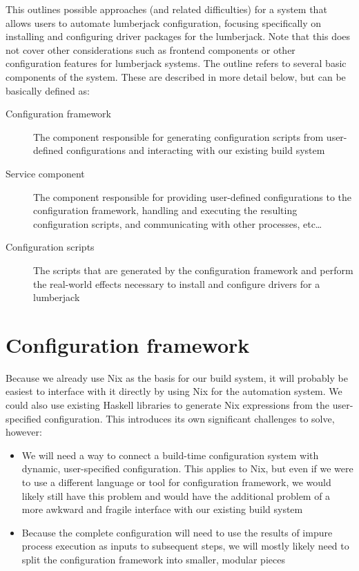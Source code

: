 \documentclass[11pt]{article}
\author{Rory Tyler Hayford}
\date{\today}
\title{}
\begin{document}
\setcounter{tocdepth}{3}
\tableofcontents

This outlines possible approaches (and related difficulties) for a system that allows users to automate lumberjack configuration, focusing specifically on installing and configuring driver packages for the lumberjack. Note that this does not cover other considerations such as frontend components or other configuration features for lumberjack systems. The outline refers to several basic components of the system. These are described in more detail below, but can be basically defined as:
\begin{description}
\item[{Configuration framework}] The component responsible for generating configuration scripts from user-defined configurations and interacting with our existing build system
\item[{Service component}] The component responsible for providing user-defined configurations to the configuration framework, handling and executing the resulting configuration scripts, and communicating with other processes, etc\ldots{}
\item[{Configuration scripts}] The scripts that are generated by the configuration framework and perform the real-world effects necessary to install and configure drivers for a lumberjack
\end{description}
\section*{Configuration framework}
\label{sec:org857922d}
Because we already use Nix as the basis for our build system, it will probably be easiest to interface with it directly by using Nix for the automation system. We could also use existing Haskell libraries to generate Nix expressions from the user-specified configuration. This introduces its own significant challenges to solve, however:
\begin{itemize}
\item We will need a way to connect a build-time configuration system with dynamic, user-specified configuration. This applies to Nix, but even if we were to use a different language or tool for configuration framework, we would likely still have this problem and would have the additional problem of a more awkward and fragile interface with our existing build system
\item Because the complete configuration will need to use the results of impure process execution as inputs to subsequent steps, we will mostly likely need to split the configuration framework into smaller, modular pieces
\end{itemize}
\end{document}
